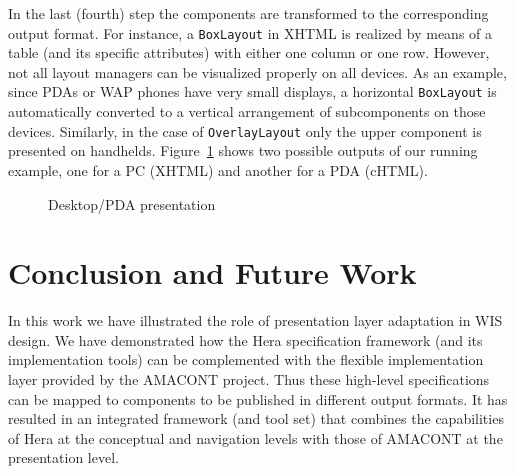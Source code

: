 \documentclass[oribibl]{llncs}
\begin{document}

In the last (fourth) step the components are transformed to the corresponding output format.
For instance, a \texttt{BoxLayout} in XHTML is realized by means of a table (and its specific attributes) with either one column or one row.
However, not all layout managers can be visualized properly on all devices.
As an example, since PDAs or WAP phones have very small displays, a horizontal \texttt{BoxLayout} is automatically converted to a vertical arrangement of subcomponents on those devices.
Similarly, in the case of \texttt{OverlayLayout} only the upper component is presented on handhelds.
Figure~\ref{output} shows two possible outputs of our running example, one for a PC (XHTML) and another for a PDA (cHTML).

\begin{figure}
\centering
{}
\caption{Desktop/PDA presentation}
\label{output}
\end{figure}

\section{Conclusion and Future Work}

In this work we have illustrated the role of presentation layer adaptation in WIS design. 
We have demonstrated how the Hera specification framework (and its implementation tools) can be complemented with the flexible implementation layer provided by the AMACONT project.
Thus these high-level specifications can be mapped to components to be published in different output formats.
It has resulted in an integrated framework (and tool set) that combines the capabilities of Hera at the conceptual and navigation levels with those of AMACONT at the presentation level.
\end{document}
